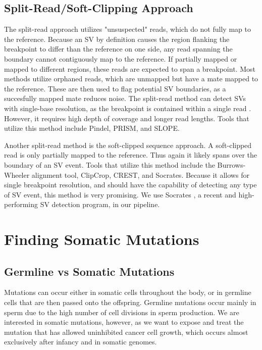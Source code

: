 \documentclass{easychithesis}
\begin{document}
\subsection{Split-Read/Soft-Clipping Approach}
The split-read approach utilizes "unsuspected" reads, which do not fully map to the reference. Because an SV by definition causes the region flanking the breakpoint to differ than the reference on one side, any read spanning the boundary cannot contiguously map to the reference. If partially mapped or mapped to different regions, these reads are expected to span a breakpoint. Most methods utilize orphaned reads, which are unmapped but have a mate mapped to the reference. These are then used to flag potential SV boundaries, as a succesfully mapped mate reduces noise. The split-read method can detect SVs with single-base resolution, as the breakpoint is contained within a single read \cite{schroder2014socrates, suzuki2011clipcrop}. However, it requires high depth of coverage and longer read lengths\cite{suzuki2011clipcrop}. Tools that utilize this method include Pindel, PRISM, and SLOPE.

Another split-read method is the soft-clipped sequence approach. A soft-clipped read is only partially mapped to the reference. Thus again it likely spans over the boundary of an SV event. Tools that utilize this method include the Burrows-Wheeler alignment tool, ClipCrop, CREST, and Socrates. Because it allows for single breakpoint resolution, and should have the capability of detecting any type of SV event, this method is very promising. We use Socrates \cite{schroder2014socrates}, a recent and high-performing SV detection program, in our pipeline.

\section{Finding Somatic Mutations}
\subsection{Germline vs Somatic Mutations}
Mutations can occur either in somatic cells throughout the body, or in germline cells that are then passed onto the offspring. Germline mutations occur mainly in sperm due to the high number of cell divisions in sperm production. We are interested in somatic mutations, however, as we want to expose and treat the mutation that has allowed uninhibited cancer cell growth, which occurs almost exclusively after infancy and in somatic genomes.
\end{document}
